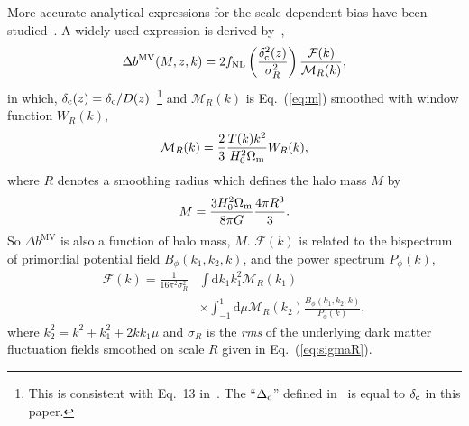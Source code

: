 \documentclass[twocolumn,floatfix,nofootinbib,aps,reprint]{revtex4}
\begin{document}
More accurate analytical expressions for the scale-dependent bias
have been studied~\cite{2008ApJ...677L..77M,2008ApJ...684L...1C, 
2008JCAP...08..031S, 2011PhRvD..84f3512D, 2012PhRvD..86f3518M,
2015arXiv150705903R}. A widely used expression is derived by~\citet{2008ApJ...677L..77M},
\begin{equation}\label{eq:db_mv}
    \Delta b^\mathrm{MV}(M, z, k) = 2 f_\mathrm{NL}
    \left(\frac{\delta_{\rm c}^{2}(z)}{\sigma^2_R}\right)
     \frac{\mathcal{F}(k)}{\mathcal{M}_R(k)},
\end{equation}
in which, $\delta_{\rm c}(z)=\delta_{\rm c}/D(z)$~\footnote{This is consistent with
Eq.~13 in~\cite{2008ApJ...677L..77M}. The ``$\Delta_{\rm c}$'' defined in~\cite{2008ApJ...677L..77M}
is equal to $\delta_{\rm c}$ in this paper.} and $\mathcal{M}_R(k)$ is Eq.~(\ref{eq:m}) smoothed with window function $W_R(k)$,
\begin{equation}
    \mathcal{M}_R(k) = \frac{2}{3}\frac{T(k)k^2}{H^2_0\Omega_{\rm m}}W_R(k),
\end{equation}
where 
$R$ denotes a smoothing radius which defines the halo mass $M$ by
\begin{equation}\label{eq:sigmaR}
    M=\frac{3H_0^2\Omega_{\rm m}}{8\pi G}\frac{4\pi R^3}{3}.
\end{equation}
So $\Delta b^\mathrm{MV}$
is also a function of halo mass, $M$. $\mathcal{F}(k)$ is related 
to the bispectrum of primordial potential field $B_\phi(k_1, k_2, k)$,
and the power spectrum $P_\phi(k)$,
\begin{equation}\label{eq:fk}
    \begin{split}
        \mathcal{F}(k) = \frac{1}{16\pi^2\sigma_R^2} &
        \int \mathrm{d}k_1 k_1^2 \mathcal{M}_R(k_1) \\
        & \times \int_{-1}^{1} \mathrm{d}\mu \mathcal{M}_R(k_2)
        \frac{B_\phi(k_1, k_2, k)}{P_\phi(k)},
    \end{split}
\end{equation}
where $k_2^2 = k^2 + k_1^2 + 2kk_1\mu$ and $\sigma_R$ is the {\it rms}
of the underlying dark matter fluctuation fields smoothed on scale
$R$ given in Eq.~(\ref{eq:sigmaR}).
\end{document}
